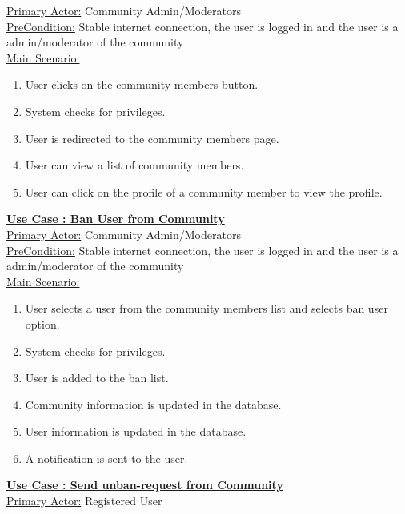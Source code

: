 \documentclass[conference,compsoc]{IEEEtran}
\newcounter{UC}
\newcommand{\nextU}{\stepcounter{UC}\theUC}
\begin{document}
\underline{Primary Actor:} Community Admin/Moderators\\

\underline{PreCondition:} Stable internet connection, the user is logged in and the user is a admin/moderator of the community\\

\underline{Main Scenario:}\\
\begin{enumerate}
    \item User clicks on the community members button.
    \item System checks for privileges.
    \item User is redirected to the community members page.
    \item User can view a list of community members.
    \item User can click on the profile of a community member to view the profile.
\end{enumerate}

\underline{\textbf{Use Case \nextU: Ban User from Community}}\\

\underline{Primary Actor:} Community Admin/Moderators\\

\underline{PreCondition:} Stable internet connection, the user is logged in and the user is a admin/moderator of the community\\

\underline{Main Scenario:}\\

\begin{enumerate}
    \item User selects a user from the community members list and selects ban user option.
    \item System checks for privileges.
    \item User is added to the ban list.
    \item Community information is updated in the database.
    \item User information is updated in the database.
    \item A notification is sent to the user.
\end{enumerate}

\underline{\textbf{Use Case \nextU: Send unban-request from Community}}\\

\underline{Primary Actor:} Registered User\\
\end{document}
